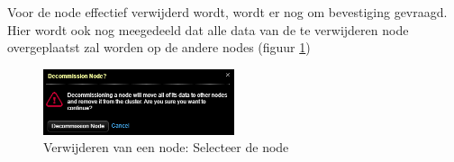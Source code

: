 Voor de node effectief verwijderd wordt, wordt er nog om bevestiging gevraagd.
Hier wordt ook nog meegedeeld dat alle data van de te verwijderen node overgeplaatst zal worden op de andere nodes (figuur \ref{fig:cas_rem_3})

\begin{figure}[H]
	\centering
	\includegraphics[width=0.5\textwidth]{img/4_installatie_cassandra/5_Remove_Node_3}
	\caption{Verwijderen van een node: Selecteer de node}
	\label{fig:cas_rem_3}
\end{figure}